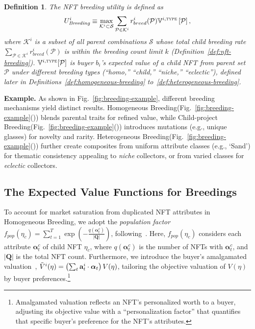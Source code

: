 \documentclass[conference]{IEEEtran}
\newcommand{\1}[1]{\mathds{1}\left[#1\right]}
\theoremstyle{plain}
\newtheorem{definition}{Definition}
\newcommand*{\defeq}{\equiv}
\newcommand{\breedrate}{child breeding rate\xspace}
\newcommand{\homob}{Homogeneous Breeding\xspace}
\newcommand{\heterb}{Heterogeneous Breeding\xspace}
\newcommand{\childb}{Child-project Breeding\xspace}
\begin{document}
\begin{definition}
    \label{def:buyer-utility-breeding}
    The NFT breeding utility is defined as
    \begin{equation}\small
    \label{eqn:breeding-utility}
    U^i_\textit{Breeding} \defeq \max_{\mathcal{K}^i\subset\mathcal{S}} \sum_{\mathcal{P}\in \mathcal{K}^i}
    r_{breed}^i(\mathcal{P})\mathbb{V}^{i, \textsc{type}}\left[\mathcal{P}\right],
    \end{equation}
    where $\mathcal{K}^i$ is a subset of all parent combinations $\mathcal{S}$ whose total \breedrate $\sum_{\mathcal{P}\in \mathcal{K}^i}r_{breed}^i(\mathcal{P})$ is within the breeding count limit $k$ (Definition~\ref{def:nft-breeding}). $\mathbb{V}^{i, \textsc{type}}[\mathcal{P}]$ is buyer $b_i$'s expected value of a child NFT from parent set $\mathcal{P}$ under different breeding types (``homo,'' ``child,'' ``niche,'' ``eclectic''), defined later in Definitions~\ref{def:homogeneous-breeding} to~\ref{def:heterogeneous-breeding}.
\end{definition}
\noindent\textbf{Example.} As shown in Fig.~\ref{fig:breeding-example}, different breeding mechanisms yield distinct results. \homob (Fig.~\ref{fig:breeding-example}()) blends parental traits for refined value, while \childb (Fig.~\ref{fig:breeding-example}()) introduces mutations (e.g., unique glasses) for novelty and rarity. \heterb (Fig.~\ref{fig:breeding-example}()) further create composites from uniform attribute classes (e.g., `Sand') for thematic consistency appealing to \textit{niche} collectors, or from varied classes for \textit{eclectic} collectors. 

\subsection{The Expected Value Functions for Breedings}
\label{subsec:expected-value-breeding}

To account for market saturation from duplicated NFT attributes in \homob, we adopt the \emph{population factor} $f_{pop}(\eta_c)=\sum_{t=1}^{T}\exp\left(-\frac{q(\bm{\alpha}^c_t)}{|\mathbf{Q}|}\right)$, following~\cite{mekacher2022heterogeneous}. Here, $f_{pop}(\eta_c)$ considers each attribute $\bm{\alpha}^c_t$ of child NFT $\eta_c$, where $q(\bm{\alpha}^c_t)$ is the number of NFTs with $\bm{\alpha}^c_t$, and $|\mathbf{Q}|$ is the total NFT count. Furthermore, we introduce the buyer's amalgamated valuation~\cite{mekacher2022heterogeneous, costa2023show}, $\Tilde{V}^i(\eta) = \left(\sum_t\mathbf{a}^{i}_t \cdot \bm{\alpha}_t \right)V(\eta)$, tailoring the objective valuation of $V(\eta)$ by buyer preferences.\footnote{Amalgamated valuation reflects an NFT's personalized worth to a buyer, adjusting its objective value with a ``personalization factor'' that quantifies that specific buyer's preference for the NFT's attributes.}
\end{document}
